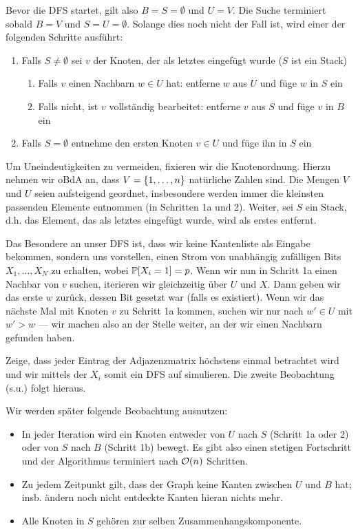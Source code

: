Bevor die DFS startet, gilt also $B = S = \emptyset$ und $U = V$.
Die Suche terminiert sobald $B = V$ und $S = U = \emptyset$.
Solange dies noch nicht der Fall ist, wird einer der folgenden Schritte ausführt:

\begin{enumerate}
    \item Falls $S \ne \emptyset$ sei $v$ der Knoten, der als letztes eingefügt wurde ($S$ ist ein Stack)
          \begin{enumerate}
              \item Falls $v$ einen Nachbarn $w \in U$ hat: entferne $w$ aus $U$ und füge $w$ in $S$ ein
              \item Falls nicht, ist $v$ vollständig bearbeitet: entferne $v$ aus $S$ und füge $v$ in $B$ ein
          \end{enumerate}
    \item Falls $S = \emptyset$ entnehme den ersten Knoten $v \in U$ und füge ihn in $S$ ein
\end{enumerate}

Um Uneindeutigkeiten zu vermeiden, fixieren wir die Knotenordnung.
Hierzu nehmen wir oBdA an, dass $V = \left\{1, \ldots, n\right\}$ natürliche Zahlen sind.
Die Mengen $V$ und $U$ seien aufsteigend geordnet, insbesondere werden immer die kleinsten passenden Elemente entnommen (in Schritten 1a und 2).
Weiter, sei $S$ ein Stack, d.h. das Element, das als letztes eingefügt wurde, wird als erstes entfernt.

Das Besondere an unser DFS ist, dass wir keine Kantenliste als Eingabe bekommen, sondern uns vorstellen, einen Strom von unabhängig zufälligen Bits $X_1, \ldots, X_N$ zu erhalten, wobei $\mathbb{P}\!\left[X_i = 1\right] = p$.
Wenn wir nun in Schritt 1a einen Nachbar von $v$ suchen, iterieren wir gleichzeitig über $U$ und $X$.
Dann geben wir das erste $w$ zurück, dessen Bit gesetzt war (falls es existiert).
Wenn wir das nächste Mal mit Knoten $v$ zu Schritt 1a kommen, suchen wir nur nach $w' \in U$ mit $w' > w$ --- wir machen also an der Stelle weiter, an der wir einen Nachbarn gefunden haben.

\begin{exercise}
    Zeige, dass jeder Eintrag der Adjazenzmatrix höchstens einmal betrachtet wird und wir mittels der $X_i$ somit ein DFS auf \Gnp simulieren.
    Die zweite Beobachtung (s.u.) folgt hieraus.
\end{exercise}

\noindent
Wir werden später folgende Beobachtung ausnutzen:
\begin{itemize}
    \item In jeder Iteration wird ein Knoten entweder von $U$ nach $S$ (Schritt 1a oder 2) oder von $S$ nach $B$ (Schritt 1b) bewegt.
          Es gibt also einen stetigen Fortschritt und der Algorithmus terminiert nach $\mathcal{O}\!\left(n\right)$ Schritten.
    \item Zu jedem Zeitpunkt gilt, dass der Graph keine Kanten zwischen $U$ und $B$ hat; insb. ändern noch nicht entdeckte Kanten hieran nichts mehr.
    \item Alle Knoten in $S$ gehören zur selben Zusammenhangskomponente.
\end{itemize}


